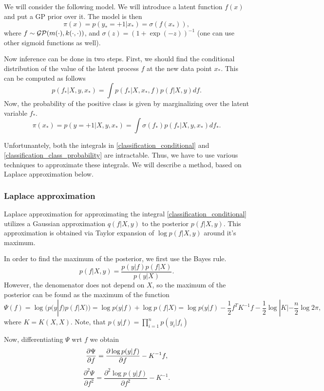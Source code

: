 \documentclass[12pt]{article}
\begin{document}
	We will consider the following model. We will introduce a latent function $f(x)$ and put a GP prior over it. The model is then
	$$\pi(x) = p(y_* = +1 | x_*) = \sigma(f(x_*)),$$
	where $f \sim \mathcal{GP}(m(\cdot), k(\cdot, \cdot))$, and $\sigma(z) = (1 + \exp(-z))^{-1}$ (one can use other sigmoid functions as well).

	Now inference can be done in two steps. First, we should find the conditional distribution of the value of the latent process $f$ at the new data point $x_*$. This can be computed as follows
	\begin{equation}
		\label{classification_conditional}
		p(f_* | X, y, x_*) = \int p(f_* | X, x_*, f) p(f | X, y) df.
	\end{equation}
	Now, the probability of the positive class is given by marginalizing over the latent variable $f_*$.
	\begin{equation}
		\label{classification_class_probability}
		\pi(x_*) = p(y = +1 | X, y, x_*) = \int \sigma(f_*) p(f_* | X, y, x_*) df_*.
	\end{equation}

	Unfortunantely, both the integrals in \ref{classification_conditional} and \ref{classification_class_probability} are intractable. Thus, we have to use various techniques to approximate these integrals. We will describe a method, based on Laplace approximation below.

	\subsubsection{Laplace approximation}
		Laplace approximation for approximating the integral \ref{classification_conditional} utilizes a Gaussian approximation $q(f| X, y)$ to the posterior $p(f | X, y)$. This approximation is obtained via Taylor expansion of $\log p(f| X, y)$ around it's maximum.

		In order to find the maximum of the posterior, we first use the Bayes rule.
		$$p(f | X, y) = \frac{p(y | f) p(f | X)}{p(y | X)}.$$
		However, the denomenator does not depend on $X$, so the maximum of the posterior can be found as the maximum of the function
		$$\Psi(f) = \log(p(y | f) p(f | X)) = \log p(y | f) + \log p(f | X) = \log p(y | f) - \frac 1 2 f^T K^{-1} f - \frac 1 2 \log |K| - \frac n 2 \log 2 \pi,$$
		where $K = K(X, X)$. Note, that $p(y | f) = \prod_{i = 1}^n p(y_i | f_i)$

		Now, differentiating $\Psi$ wrt $f$ we obtain
		$$\frac{\partial \Psi}{\partial f} = \frac{\partial \log p(y | f)}{\partial f} - K^{-1} f,$$
		$$\frac{\partial^2\Psi}{\partial f^2} = \frac{\partial^2 \log p(y | f)}{\partial f^2} - K^{-1}.$$
\end{document}
